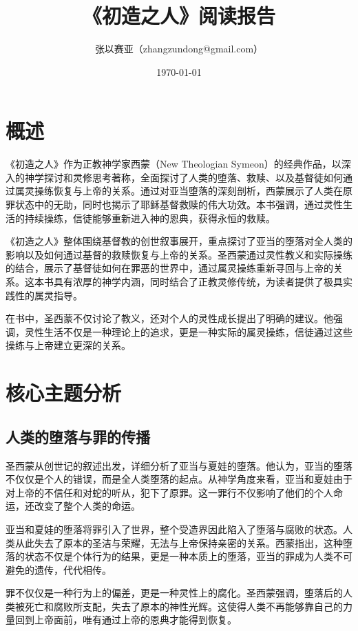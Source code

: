 \documentclass[12pt, a4paper]{ctexart}
\title{《初造之人》阅读报告}
\author{张以赛亚（zhangzundong@gmail.com）}
\date{\today}
\begin{document}

\tableofcontents
\newpage
\section{概述}
《初造之人》作为正教神学家西蒙（New Theologian Symeon）的经典作品，以深入的神学探讨和灵修思考著称，全面探讨了人类的堕落、救赎、以及基督徒如何通过属灵操练恢复与上帝的关系。通过对亚当堕落的深刻剖析，西蒙展示了人类在原罪状态中的无助，同时也揭示了耶稣基督救赎的伟大功效。本书强调，通过灵性生活的持续操练，信徒能够重新进入神的恩典，获得永恒的救赎。

《初造之人》整体围绕基督教的创世叙事展开，重点探讨了亚当的堕落对全人类的影响以及如何通过基督的救赎恢复与上帝的关系。圣西蒙通过灵性教义和实际操练的结合，展示了基督徒如何在罪恶的世界中，通过属灵操练重新寻回与上帝的关系。这本书具有浓厚的神学内涵，同时结合了正教灵修传统，为读者提供了极具实践性的属灵指导。

在书中，圣西蒙不仅讨论了教义，还对个人的灵性成长提出了明确的建议。他强调，灵性生活不仅是一种理论上的追求，更是一种实际的属灵操练，信徒通过这些操练与上帝建立更深的关系。

\section{核心主题分析}
\subsection{人类的堕落与罪的传播}
圣西蒙从创世记的叙述出发，详细分析了亚当与夏娃的堕落。他认为，亚当的堕落不仅仅是个人的错误，而是全人类堕落的起点。从神学角度来看，亚当和夏娃由于对上帝的不信任和对蛇的听从，犯下了原罪。这一罪行不仅影响了他们的个人命运，还改变了整个人类的命运。

亚当和夏娃的堕落将罪引入了世界，整个受造界因此陷入了堕落与腐败的状态。人类从此失去了原本的圣洁与荣耀，无法与上帝保持亲密的关系。西蒙指出，这种堕落的状态不仅是个体行为的结果，更是一种本质上的堕落，亚当的罪成为人类不可避免的遗传，代代相传。

罪不仅仅是一种行为上的偏差，更是一种灵性上的腐化。圣西蒙强调，堕落后的人类被死亡和腐败所支配，失去了原本的神性光辉。这使得人类不再能够靠自己的力量回到上帝面前，唯有通过上帝的恩典才能得到恢复。
\end{document}
